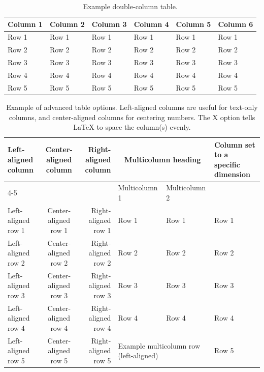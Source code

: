 \documentclass[twocolumn,twoside]{base/jrekpros}
\begin{document}
\begin{table}[b]
  	\centering\footnotesize\sffamily
  	\caption{Example double-column table.}
  	\begin{tableminipage}{\linewidth}
    	\begin{tabularx} {\linewidth}{XXXXXX}
			\toprule
            Column 1 & Column 2 & Column 3 & Column 4 & Column 5 & Column 6 \\
	    	\midrule
            Row 1 & Row 1 & Row 1 & Row 1 & Row 1 & Row 1 \\
            Row 2 & Row 2 & Row 2 & Row 2 & Row 2 & Row 2 \\
            Row 3 & Row 3 & Row 3 & Row 3 & Row 3 & Row 3 \\
            Row 4 & Row 4 & Row 4 & Row 4 & Row 4 & Row 4 \\
            Row 5 & Row 5 & Row 5 & Row 5 & Row 5 & Row 5 \\
            \bottomrule
    	\end{tabularx}
        \label{tab:2}
  	\end{tableminipage}
\end{table}

\begin{table}[b]
    \vspace{-6pt} %
  	\centering\footnotesize\sffamily
  	\caption{Example of advanced table options. Left-aligned columns are useful for text-only columns, and center-aligned columns for centering numbers. The X option tells \LaTeX{} to space the column(s) evenly.}
  	\begin{tableminipage}{\linewidth}
    	\begin{tabularx} {\linewidth}{lcrXXp{3cm}}
			\toprule
            Left-aligned column & Center-aligned column & Right-aligned column & \multicolumn{2}{c}{Multicolumn heading} & Column set to a specific \newline dimension \\
            \cmidrule{4-5}
            & & & Multicolumn 1 & Multicolumn 2 & \\
	    	\midrule
            Left-aligned row 1 & Center-aligned row 1 & Right-aligned row 1 & Row 1 & Row 1 & Row 1 \\
            Left-aligned row 2 & Center-aligned row 2 & Right-aligned row 2 & Row 2 & Row 2 & Row 2 \\
            Left-aligned row 3 & Center-aligned row 3 & Right-aligned row 3 & Row 3 & Row 3 & Row 3 \\
            Left-aligned row 4 & Center-aligned row 4 & Right-aligned row 4 & Row 4 & Row 4 & Row 4 \\
            Left-aligned row 5 & Center-aligned row 5 & Right-aligned row 5 & \multicolumn{2}{l}{Example multicolumn row (left-aligned)} & Row 5 \\
            \bottomrule
    	\end{tabularx}
        \label{tab:3}
  	\end{tableminipage}
\end{table}
\end{document}
